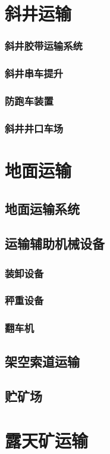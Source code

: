 \documentclass[UTF8]{../../ApplicationUniverse}
\begin{document}
\section{斜井运输}
    \subsubsection{斜井胶带运输系统}
    \subsubsection{斜井串车提升}
    \subsubsection{防跑车装置}
    \subsubsection{斜井井口车场}
\section{地面运输}
    \subsection{地面运输系统}
    \subsection{运输辅助机械设备}
        \subsubsection{装卸设备}
        \subsubsection{秤重设备}
        \subsubsection{翻车机}
    \subsection{架空索道运输}
    \subsection{贮矿场}
\section{露天矿运输}
\end{document}
